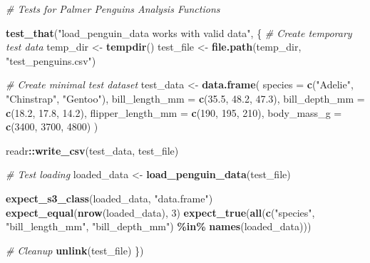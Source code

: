 \documentclass[
]{article}
\newenvironment{Shaded}{\begin{snugshade}}{\end{snugshade}}
\newcommand{\AttributeTok}[1]{\textcolor[rgb]{0.13,0.29,0.53}{#1}}
\newcommand{\CommentTok}[1]{\textcolor[rgb]{0.56,0.35,0.01}{\textit{#1}}}
\newcommand{\DecValTok}[1]{\textcolor[rgb]{0.00,0.00,0.81}{#1}}
\newcommand{\FloatTok}[1]{\textcolor[rgb]{0.00,0.00,0.81}{#1}}
\newcommand{\FunctionTok}[1]{\textcolor[rgb]{0.13,0.29,0.53}{\textbf{#1}}}
\newcommand{\NormalTok}[1]{#1}
\newcommand{\OtherTok}[1]{\textcolor[rgb]{0.56,0.35,0.01}{#1}}
\newcommand{\SpecialCharTok}[1]{\textcolor[rgb]{0.81,0.36,0.00}{\textbf{#1}}}
\newcommand{\StringTok}[1]{\textcolor[rgb]{0.31,0.60,0.02}{#1}}
\begin{document}
\begin{Shaded}
\begin{Highlighting}[]
\CommentTok{\# Tests for Palmer Penguins Analysis Functions}

\FunctionTok{test\_that}\NormalTok{(}\StringTok{"load\_penguin\_data works with valid data"}\NormalTok{, \{}
  \CommentTok{\# Create temporary test data}
\NormalTok{  temp\_dir }\OtherTok{\textless{}{-}} \FunctionTok{tempdir}\NormalTok{()}
\NormalTok{  test\_file }\OtherTok{\textless{}{-}} \FunctionTok{file.path}\NormalTok{(temp\_dir, }\StringTok{"test\_penguins.csv"}\NormalTok{)}

  \CommentTok{\# Create minimal test dataset}
\NormalTok{  test\_data }\OtherTok{\textless{}{-}} \FunctionTok{data.frame}\NormalTok{(}
    \AttributeTok{species =} \FunctionTok{c}\NormalTok{(}\StringTok{"Adelie"}\NormalTok{, }\StringTok{"Chinstrap"}\NormalTok{, }\StringTok{"Gentoo"}\NormalTok{),}
    \AttributeTok{bill\_length\_mm =} \FunctionTok{c}\NormalTok{(}\FloatTok{35.5}\NormalTok{, }\FloatTok{48.2}\NormalTok{, }\FloatTok{47.3}\NormalTok{),}
    \AttributeTok{bill\_depth\_mm =} \FunctionTok{c}\NormalTok{(}\FloatTok{18.2}\NormalTok{, }\FloatTok{17.8}\NormalTok{, }\FloatTok{14.2}\NormalTok{),}
    \AttributeTok{flipper\_length\_mm =} \FunctionTok{c}\NormalTok{(}\DecValTok{190}\NormalTok{, }\DecValTok{195}\NormalTok{, }\DecValTok{210}\NormalTok{),}
    \AttributeTok{body\_mass\_g =} \FunctionTok{c}\NormalTok{(}\DecValTok{3400}\NormalTok{, }\DecValTok{3700}\NormalTok{, }\DecValTok{4800}\NormalTok{)}
\NormalTok{  )}

\NormalTok{  readr}\SpecialCharTok{::}\FunctionTok{write\_csv}\NormalTok{(test\_data, test\_file)}

  \CommentTok{\# Test loading}
\NormalTok{  loaded\_data }\OtherTok{\textless{}{-}} \FunctionTok{load\_penguin\_data}\NormalTok{(test\_file)}

  \FunctionTok{expect\_s3\_class}\NormalTok{(loaded\_data, }\StringTok{"data.frame"}\NormalTok{)}
  \FunctionTok{expect\_equal}\NormalTok{(}\FunctionTok{nrow}\NormalTok{(loaded\_data), }\DecValTok{3}\NormalTok{)}
  \FunctionTok{expect\_true}\NormalTok{(}\FunctionTok{all}\NormalTok{(}\FunctionTok{c}\NormalTok{(}\StringTok{"species"}\NormalTok{, }\StringTok{"bill\_length\_mm"}\NormalTok{, }\StringTok{"bill\_depth\_mm"}\NormalTok{) }\SpecialCharTok{\%in\%} \FunctionTok{names}\NormalTok{(loaded\_data)))}

  \CommentTok{\# Cleanup}
  \FunctionTok{unlink}\NormalTok{(test\_file)}
\NormalTok{\})}


\end{Highlighting}
\end{Shaded}
\end{document}

